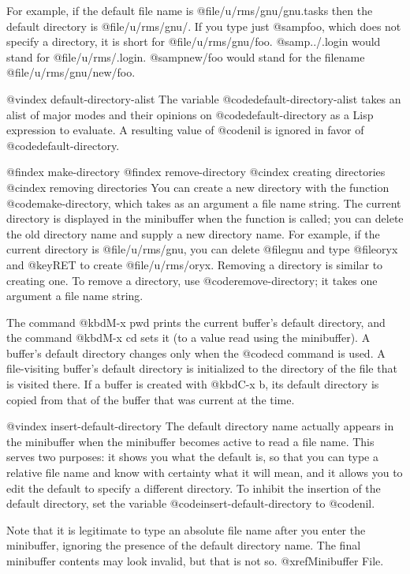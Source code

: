 {{{{{{{{{{{{{{{{  For example, if the default file name is @file{/u/rms/gnu/gnu.tasks} then
the default directory is @file{/u/rms/gnu/}.  If you type just @samp{foo},
which does not specify a directory, it is short for @file{/u/rms/gnu/foo}.
@samp{../.login} would stand for @file{/u/rms/.login}.  @samp{new/foo}
would stand for the filename @file{/u/rms/gnu/new/foo}.

@vindex default-directory-alist
The variable @code{default-directory-alist} takes an alist of major
modes and their opinions on @code{default-directory} as a Lisp
expression to evaluate.  A resulting value of @code{nil} is ignored in
favor of @code{default-directory}.

@findex make-directory
@findex remove-directory
@cindex creating directories
@cindex removing directories
You can create a new directory with the function @code{make-directory},
which takes as an argument a file name string. The current directory is
displayed in the minibuffer when the function is called; you can delete
the old directory name and supply a new directory name. For example, if
the current directory is @file{/u/rms/gnu}, you can delete @file{gnu}
and type @file{oryx} and @key{RET} to create @file{/u/rms/oryx}.
Removing a directory is similar to creating one.  To remove a directory,
use @code{remove-directory}; it takes one argument a file name string.

  The command @kbd{M-x pwd} prints the current buffer's default directory,
and the command @kbd{M-x cd} sets it (to a value read using the
minibuffer).  A buffer's default directory changes only when the @code{cd}
command is used.  A file-visiting buffer's default directory is initialized
to the directory of the file that is visited there.  If a buffer is created
with @kbd{C-x b}, its default directory is copied from that of the
buffer that was current at the time.

@vindex insert-default-directory
  The default directory name actually appears in the minibuffer when the
minibuffer becomes active to read a file name.  This serves two
purposes: it shows you what the default is, so that you can type a
relative file name and know with certainty what it will mean, and it
allows you to edit the default to specify a different directory.  To
inhibit the insertion of the default directory, set the variable
@code{insert-default-directory} to @code{nil}.

  Note that it is legitimate to type an absolute file name after you
enter the minibuffer, ignoring the presence of the default directory
name.  The final minibuffer contents may look invalid, but that is not
so.  @xref{Minibuffer File}.

}}}}}}}}}}}}}}}}

